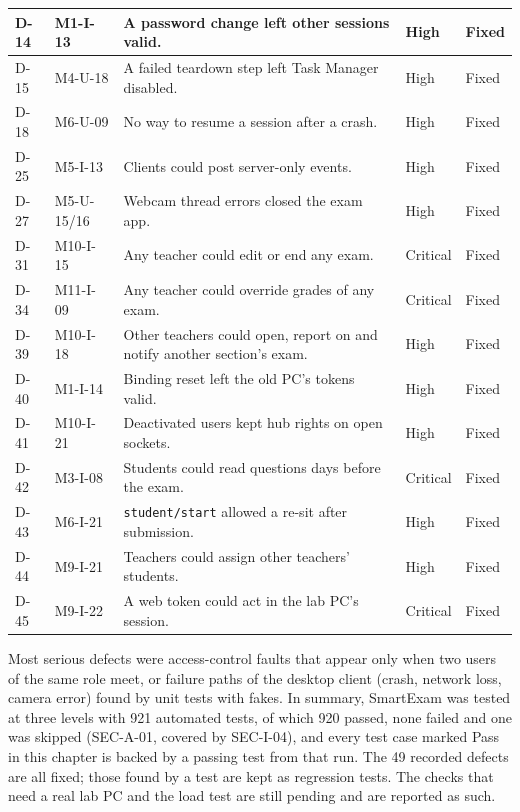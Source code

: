{\begin{longtable}{@{}P{1.5cm}P{2.1cm}P{8.0cm}P{1.7cm}>{\centering\arraybackslash}p{1.3cm}@{}}
D-14 & M1-I-13 & A password change left other sessions valid. & High & Fixed\\ \hline
D-15 & M4-U-18 & A failed teardown step left Task Manager disabled. & High & Fixed\\ \hline
D-18 & M6-U-09 & No way to resume a session after a crash. & High & Fixed\\ \hline
D-25 & M5-I-13 & Clients could post server-only events. & High & Fixed\\ \hline
D-27 & M5-U-15/16 & Webcam thread errors closed the exam app. & High & Fixed\\ \hline
D-31 & M10-I-15 & Any teacher could edit or end any exam. & Critical & Fixed\\ \hline
D-34 & M11-I-09 & Any teacher could override grades of any exam. & Critical & Fixed\\ \hline
D-39 & M10-I-18 & Other teachers could open, report on and notify another section's exam. & High & Fixed\\ \hline
D-40 & M1-I-14 & Binding reset left the old PC's tokens valid. & High & Fixed\\ \hline
D-41 & M10-I-21 & Deactivated users kept hub rights on open sockets. & High & Fixed\\ \hline
D-42 & M3-I-08 & Students could read questions days before the exam. & Critical & Fixed\\ \hline
D-43 & M6-I-21 & \texttt{student/\allowbreak{}start} allowed a re-sit after submission. & High & Fixed\\ \hline
D-44 & M9-I-21 & Teachers could assign other teachers' students. & High & Fixed\\ \hline
D-45 & M9-I-22 & A web token could act in the lab PC's session. & Critical & Fixed\\
\end{longtable}}

Most serious defects were access-control faults that appear only when two users of the same role meet, or failure paths of the desktop client (crash, network loss, camera error) found by unit tests with fakes. In summary, SmartExam was tested at three levels with 921 automated tests, of which 920 passed, none failed and one was skipped (SEC-A-01, covered by SEC-I-04), and every test case marked Pass in this chapter is backed by a passing test from that run. The 49 recorded defects are all fixed; those found by a test are kept as regression tests. The checks that need a real lab PC and the load test are still pending and are reported as such.
